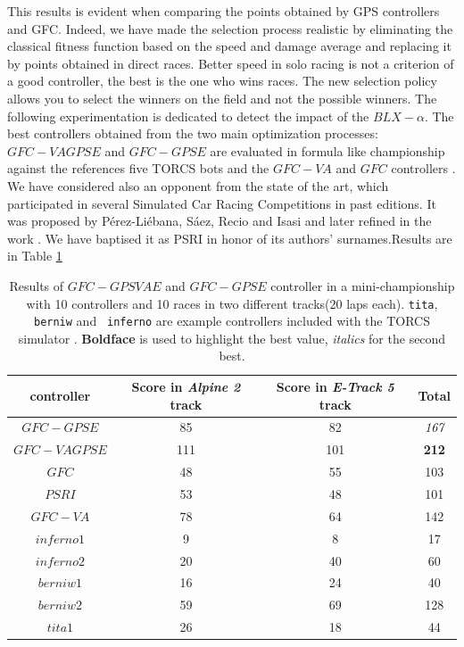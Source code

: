 \documentclass[10pt,journal,compsoc]{IEEEtran}
\begin{document}
This results is evident when comparing the points obtained by GPS controllers and GFC.
Indeed, we have made the selection process  realistic by eliminating
the classical fitness function based on the speed and damage average
and replacing it by points obtained in direct races. 
Better speed in solo racing is not a criterion of a good controller, the
best is the one who wins races. The new selection policy allows you to
select the winners on the field and not the possible winners. 
The following experimentation is dedicated to detect the impact of the $BLX-\alpha$.
The best controllers obtained from the two main optimization
processes: $GFC-VAGPSE$ and $GFC-GPSE$ are evaluated in formula like
championship against the references five TORCS bots and the $GFC-VA$\cite{DBLP:conf/cig/SalemMG19}
and $GFC$ controllers  \cite{salem_cig2018}. We have considered also an opponent from the
state of the art, which participated in several Simulated Car Racing
Competitions in past editions.  %
It was proposed by P{\'e}rez-Li{\'e}bana, S{\'a}ez, Recio and Isasi \cite{EvolvingRuleSystem08} and later refined in the work \cite{PerezEvolvingFuzzy09}. We have baptised it as PSRI in honor of its authors' surnames.Results are in Table \ref{tab:allsresults}
%
\begin{table}[ht]
	\centering
	{\scriptsize
		\caption{ Results of $GFC-GPSVAE$ and $GFC-GPSE$
                  controller in a mini-championship with 10 controllers
                  and 10 %
			races in two different tracks(20 laps each). {\tt tita}, {\tt berniw} and {\tt
				inferno} are example controllers included with the TORCS
			simulator \cite{torcs4}.  {\bf Boldface} is
                        used to highlight the best value, {\em italics} for the second
                    best.}
		{
			\begin{tabular}{|c|c|c||c|}
				\hline
				controller&Score in \textit{Alpine 2} track &Score in \textit{E-Track 5} track &Total\\
				\hline
				\hline
$GFC-GPSE$&	85&	82&	{\em 167}\\
$GFC-VAGPSE$&111&101&            {\bf 212}\\
$GFC$  \cite{salem_cig2018}&		48&	55&	103\\
$PSRI$\cite{PerezEvolvingFuzzy09}&		53&	48&	101\\
$GFC-VA$ \cite{DBLP:conf/cig/SalemMG19}&	78&	64&	142\\
$inferno1$&	9&	8&	17\\
$inferno2$&	20&	40&	60\\
$berniw1$&	16&	24&	40\\
$berniw2$&	59&	69&	128\\
$tita1$&	26&	18&	44\\
					\hline
				
			\end{tabular}
		}\label{tab:allsresults}
	}
\end{table}
%
\end{document}
